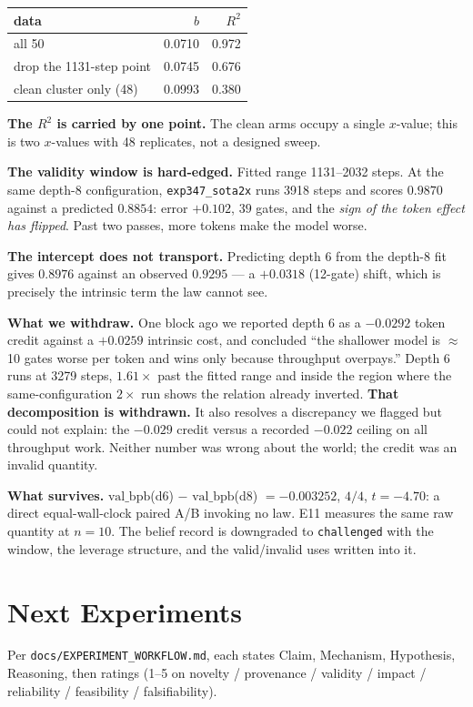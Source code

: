 \documentclass{article}
\newcommand{\vb}{\mathrm{val\_bpb}}
\begin{document}
\begin{center}\begin{small}
\begin{tabular}{lrr}
\toprule
data & $b$ & $R^2$ \\
\midrule
all 50 & 0.0710 & 0.972 \\
drop the 1131-step point & 0.0745 & 0.676 \\
clean cluster only (48) & 0.0993 & 0.380 \\
\bottomrule
\end{tabular}
\end{small}\end{center}

\textbf{The $R^2$ is carried by one point.} The clean arms occupy a single $x$-value; this is two $x$-values with 48 replicates, not a designed sweep.

\textbf{The validity window is hard-edged.} Fitted range 1131--2032 steps. At the same depth-8 configuration, \texttt{exp347\_sota2x} runs 3918 steps and scores $0.9870$ against a predicted $0.8854$: error $+0.102$, $39$ gates, and the \emph{sign of the token effect has flipped}. Past two passes, more tokens make the model worse.

\textbf{The intercept does not transport.} Predicting depth 6 from the depth-8 fit gives $0.8976$ against an observed $0.9295$ --- a $+0.0318$ (12-gate) shift, which is precisely the intrinsic term the law cannot see.

\textbf{What we withdraw.} One block ago we reported depth 6 as a $-0.0292$ token credit against a $+0.0259$ intrinsic cost, and concluded ``the shallower model is $\approx$10 gates worse per token and wins only because throughput overpays.'' Depth 6 runs at 3279 steps, $1.61\times$ past the fitted range and inside the region where the same-configuration $2\times$ run shows the relation already inverted. \textbf{That decomposition is withdrawn.} It also resolves a discrepancy we flagged but could not explain: the $-0.029$ credit versus a recorded $-0.022$ ceiling on all throughput work. Neither number was wrong about the world; the credit was an invalid quantity.

\textbf{What survives.} $\vb$(d6) $-$ $\vb$(d8) $= -0.003252$, $4/4$, $t=-4.70$: a direct equal-wall-clock paired A/B invoking no law. E11 measures the same raw quantity at $n{=}10$. The belief record is downgraded to \texttt{challenged} with the window, the leverage structure, and the valid/invalid uses written into it.

\section{Next Experiments}
Per \texttt{docs/EXPERIMENT\_WORKFLOW.md}, each states Claim, Mechanism, Hypothesis, Reasoning, then ratings (1--5 on novelty / provenance / validity / impact / reliability / feasibility / falsifiability).
\end{document}
